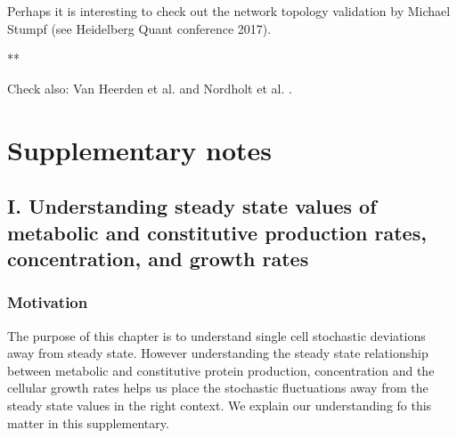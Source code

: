Perhaps it is interesting to check out the network topology validation by Michael Stumpf (see Heidelberg Quant conference 2017). 

**


Check also:
Van Heerden et al. \cite{VanHeerden2017}
and
Nordholt et al. \cite{Nordholt2017}.


\clearpage
\FloatBarrier
\section*{Supplementary notes}

\subsection*{I. Understanding steady state values of metabolic and constitutive production rates, concentration, and growth rates}

\subsubsection{Motivation}
The purpose of this chapter is to understand 
single cell stochastic deviations away from steady state. 
%
However understanding the steady state relationship between metabolic and constitutive protein production, concentration and the cellular growth rates helps us place the stochastic fluctuations away from the steady state values in the right context.
%
We explain our understanding fo this matter in this supplementary. %

